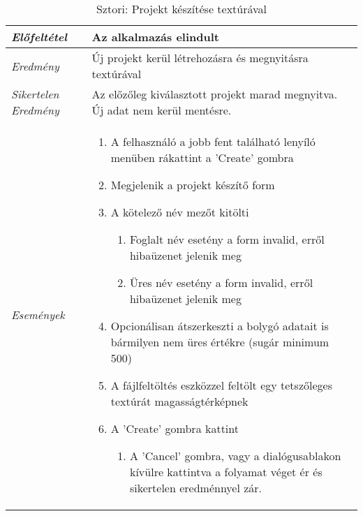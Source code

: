 \begin{table}[H]
	\centering
	\begin{tabular}{ | m{} | m{} | }
		\hline
		\emph{Előfeltétel} & Az alkalmazás elindult  \\
		\hline
		\emph{Eredmény} & Új projekt kerül létrehozásra és megnyitásra textúrával  \\
		\hline
		\emph{Sikertelen Eredmény} & Az előzőleg kiválasztott projekt marad megnyitva. Új adat nem kerül mentésre.  \\
		\hline
		\emph{Események} &

		\begin{enumerate}
			\item A felhasználó a jobb fent található lenyíló menüben rákattint a 'Create' gombra
			\item Megjelenik a projekt készítő form
			\item A kötelező név mezőt kitölti
			\begin{enumerate}
				\item Foglalt név esetény a form invalid, erről hibaüzenet jelenik meg
				\item Üres név esetény a form invalid, erről hibaüzenet jelenik meg
			\end{enumerate}
			\item Opcionálisan átszerkeszti a bolygó adatait is bármilyen nem üres értékre (sugár minimum 500)
			\item A fájlfeltöltés eszközzel feltölt egy tetszőleges textúrát magasságtérképnek
			\item A 'Create' gombra kattint
			\begin{enumerate}
				\item A 'Cancel' gombra, vagy a dialógusablakon kívülre kattintva a folyamat véget ér és sikertelen eredménnyel zár.
			\end{enumerate}
		\end{enumerate}

		\\
		\hline
	\end{tabular}
	\caption{Sztori: Projekt készítése textúrával}
	\label{tab:story-project-create-texture}
\end{table}

